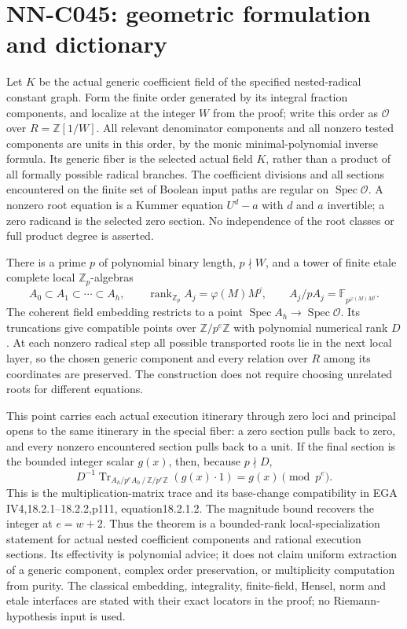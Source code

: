 \section{NN-C045: geometric formulation and dictionary}
\begin{geometricstatement}[NN-C045]
Let $K$ be the actual generic coefficient field of the specified
nested-radical constant graph. Form the finite order generated by
its integral fraction components, and localize at the integer $W$
from the proof; write this order as $\mathcal O$ over
$R=\mathbb Z[1/W]$. All relevant denominator components and all
nonzero tested components are units in this order, by the monic
minimal-polynomial inverse formula. Its generic fiber is the
selected actual field $K$, rather than a product of all formally
possible radical branches. The coefficient divisions and all
sections encountered on the finite set of Boolean input paths are
regular on $\operatorname{Spec}\mathcal O$. A nonzero root equation
is a Kummer equation $U^d-a$ with $d$ and $a$ invertible; a zero
radicand is the selected zero section. No independence of the root
classes or full product degree is asserted.

There is a prime $p$ of polynomial binary length, $p\nmid W$, and
a tower of finite etale complete local $\mathbb Z_p$-algebras
\[
 A_0\subset A_1\subset\cdots\subset A_h,
 \qquad \operatorname{rank}_{\mathbb Z_p} A_j
                       =\varphi(M)M^j,
 \qquad A_j/pA_j=\mathbb F_{p^{\varphi(M)M^j}}.
\]
The coherent field embedding restricts to a point
$\operatorname{Spec}A_h\to\operatorname{Spec}\mathcal O$.
Its truncations give compatible points over $\mathbb Z/p^e\mathbb Z$
with polynomial numerical rank $D$. At each nonzero radical step
all possible transported roots lie in the next local layer, so the
chosen generic component and every relation over $R$ among its
coordinates are preserved. The construction does not require
choosing unrelated roots for different equations.

This point carries each actual execution itinerary through zero
loci and principal opens to the same itinerary in the special
fiber: a zero section pulls back to zero, and every nonzero
encountered section pulls back to a unit. If the final section is
the bounded integer scalar $g(x)$, then, because $p\nmid D$,
\[
       D^{-1}\operatorname{Tr}_{A_h/p^eA_h\,/\,\mathbb Z/p^e\mathbb Z}
                           (g(x)\cdot1)
                         =g(x)\pmod{p^e}.
\]
This is the multiplication-matrix trace and its base-change
compatibility in EGA IV4,18.2.1--18.2.2,p111,
equation18.2.1.2. The magnitude bound recovers the integer at
$e=w+2$. Thus the theorem is a bounded-rank local-specialization
statement for actual nested coefficient components and rational
execution sections. Its effectivity is polynomial advice;
it does not claim uniform extraction of a generic component,
complex order preservation, or multiplicity computation from
purity. The classical embedding, integrality, finite-field,
Hensel, norm and etale interfaces are stated with their exact
locators in the proof; no Riemann-hypothesis input is used.


\end{geometricstatement}
